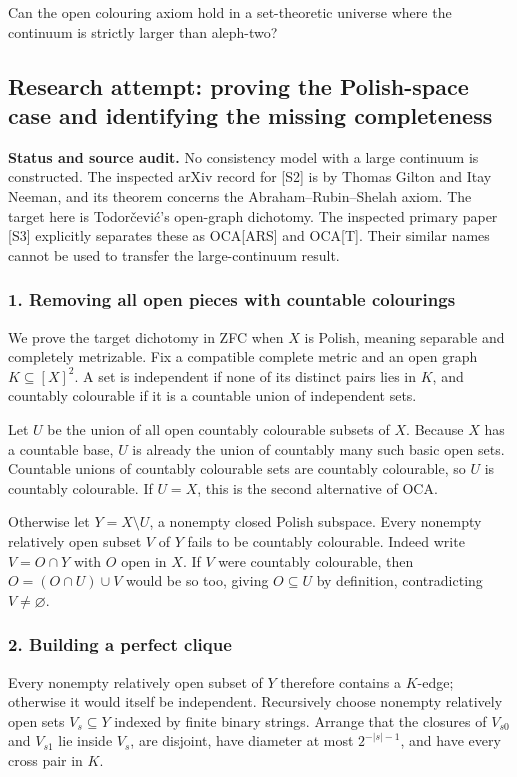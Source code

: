 \documentclass[11pt,a4paper]{article}
\begin{document}
Can the open colouring axiom hold in a set-theoretic universe where the continuum is strictly larger than aleph-two?

\subsection{Research attempt: proving the Polish-space case and identifying the missing completeness}
\textbf{Status and source audit.} No consistency model with a large continuum is constructed. The inspected arXiv record for [S2] is by Thomas Gilton and Itay Neeman, and its theorem concerns the Abraham--Rubin--Shelah axiom. The target here is Todorčević's open-graph dichotomy. The inspected primary paper [S3] explicitly separates these as OCA[ARS] and OCA[T]. Their similar names cannot be used to transfer the large-continuum result.

\subsubsection{1. Removing all open pieces with countable colourings}
We prove the target dichotomy in ZFC when $X$ is Polish, meaning separable and completely metrizable. Fix a compatible complete metric and an open graph $K\subseteq[X]^2$. A set is independent if none of its distinct pairs lies in $K$, and countably colourable if it is a countable union of independent sets.

Let $U$ be the union of all open countably colourable subsets of $X$. Because $X$ has a countable base, $U$ is already the union of countably many such basic open sets. Countable unions of countably colourable sets are countably colourable, so $U$ is countably colourable. If $U=X$, this is the second alternative of OCA.

Otherwise let $Y=X\setminus U$, a nonempty closed Polish subspace. Every nonempty relatively open subset $V$ of $Y$ fails to be countably colourable. Indeed write $V=O\cap Y$ with $O$ open in $X$. If $V$ were countably colourable, then $O=(O\cap U)\cup V$ would be so too, giving $O\subseteq U$ by definition, contradicting $V\ne\varnothing$.

\subsubsection{2. Building a perfect clique}
Every nonempty relatively open subset of $Y$ therefore contains a $K$-edge; otherwise it would itself be independent. Recursively choose nonempty relatively open sets $V_s\subseteq Y$ indexed by finite binary strings. Arrange that the closures of $V_{s0}$ and $V_{s1}$ lie inside $V_s$, are disjoint, have diameter at most $2^{-|s|-1}$, and have every cross pair in $K$.
\end{document}
